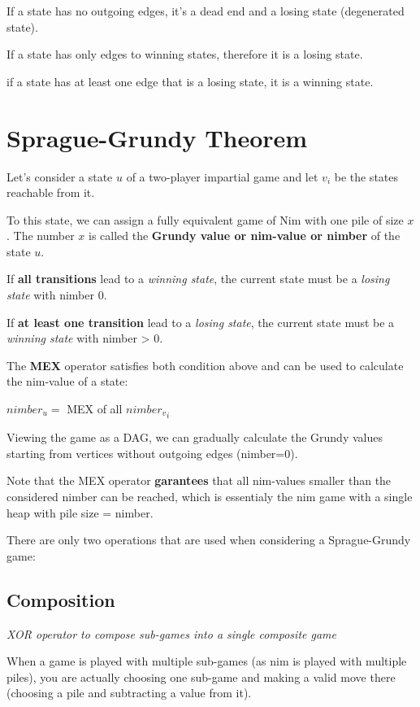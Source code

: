 If a state has no outgoing edges, it's a dead end and a losing state (degenerated state). 

If a state has only edges to winning states, therefore it is a losing state.

if a state has at least one edge that is a losing state, it is a winning state.

\section{Sprague-Grundy Theorem}

Let's consider a state $u$ of a two-player impartial game and let $v_i$ be the states reachable from it.

To this state, we can assign a fully equivalent game of Nim with one pile of size $x$. 
The number $x$ is called the \textbf{Grundy value or nim-value or nimber} of the state $u$.

If \textbf{all transitions} lead to a \textit{winning state},
the current state must be a \textit{losing state} with nimber 0.

If \textbf{at least one transition} lead to a \textit{losing state},
the current state must be a \textit{winning state} with nimber > 0.

The \textbf{MEX} operator satisfies both condition above and can be used to calculate the nim-value of a state:

${nimber}_u =$ MEX of all ${{nimber}_v}_i$

Viewing the game as a DAG, we can gradually calculate the Grundy values starting
from vertices without outgoing edges (nimber=0).

Note that the MEX operator \textbf{garantees} that all nim-values smaller than the considered nimber 
can be reached, which is essentialy the nim game with a single heap with pile size = nimber. 

There are only two operations that are used when considering a Sprague-Grundy game:

\subsection{Composition}

\textit{XOR operator to compose sub-games into a single composite game}

When a game is played with multiple sub-games (as nim is played with multiple piles), 
you are actually choosing one sub-game and making a valid move there 
(choosing a pile and subtracting a value from it).

